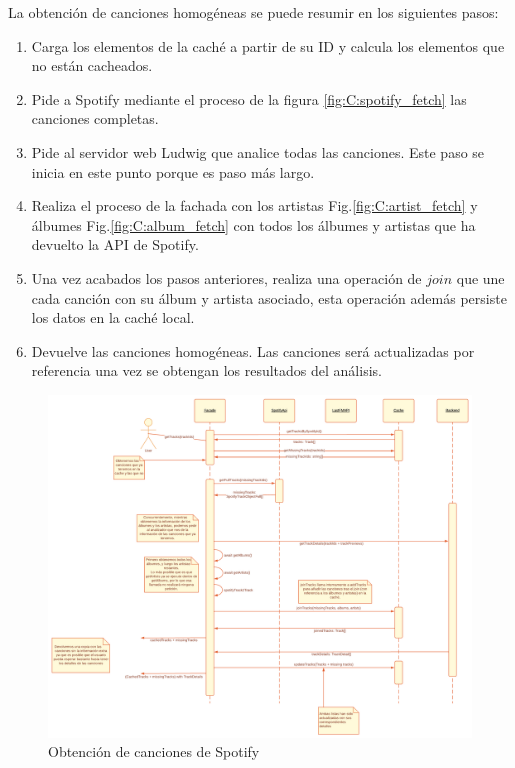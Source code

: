 La obtención de canciones homogéneas se puede resumir en los siguientes pasos:
    
\begin{enumerate}
    \item  Carga los elementos de la caché a partir de su ID y calcula los elementos que no están cacheados.
    \item Pide a Spotify mediante el proceso de la figura \ref{fig:C:spotify_fetch} las canciones completas. 
    \item Pide al servidor web Ludwig que analice todas las canciones. Este paso se inicia en este punto porque es paso más largo.
    \item Realiza el proceso de la fachada con los artistas Fig.\ref{fig:C:artist_fetch} y álbumes Fig.\ref{fig:C:album_fetch} con todos los álbumes y artistas que ha devuelto la API de Spotify.
    \item Una vez acabados los pasos anteriores, realiza una operación de $join$ que une cada canción con su álbum y artista asociado, esta operación además persiste los datos en la caché local.
    \item Devuelve las canciones homogéneas. Las canciones será actualizadas por referencia una vez se obtengan los resultados del análisis. 
\end{enumerate}


\begin{figure}
    \centering
    \includegraphics[angle=90]{img/C/track_fetch.png}
    \caption{Obtención de canciones de Spotify}
    \label{fig:C:track_fetch}
\end{figure}


